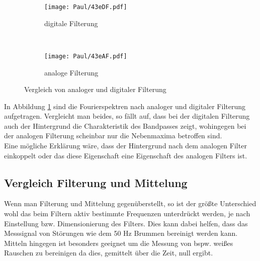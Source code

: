 \begin{figure}[h]
    \centering
    \begin{subfigure}{0.9\textwidth}
        \centering
        \texttt{[image: Paul/43eDF.pdf]}
        \caption{digitale Filterung}
    \end{subfigure}
    \\
    \begin{subfigure}{0.9\textwidth}
        \centering
        \texttt{[image: Paul/43eAF.pdf]}
        \caption{analoge Filterung}
    \end{subfigure}
    \caption{Vergleich von analoger und digitaler Filterung}
    \label{fig:43e}
\end{figure}
\newpage
In Abbildung \ref{fig:43e} sind die Fourierspektren nach analoger und digitaler Filterung aufgetragen. Vergleicht man beides, so fällt auf, dass bei der digitalen Filterung auch der Hintergrund die Charakteristik des Bandpasses zeigt, wohingegen bei der analogen Filterung scheinbar nur die Nebenmaxima betroffen sind.\\
Eine mögliche Erklärung wäre, dass der Hintergrund nach dem analogen Filter einkoppelt oder das diese Eigenschaft eine Eigenschaft des analogen Filters ist.


\subsection{Vergleich Filterung und Mittelung}
Wenn man Filterung und Mittelung gegenüberstellt, so ist der größte Unterschied wohl das beim Filtern aktiv bestimmte Frequenzen unterdrückt werden, je nach Einstellung bzw. Dimensionierung des Filters. Dies kann dabei helfen, dass das Messsignal von Störungen wie dem 50 Hz Brummen bereinigt werden kann.\\
Mitteln hingegen ist besonders geeignet um die Messung von bspw. weißes Rauschen zu bereinigen da dies, gemittelt über die Zeit, null ergibt.